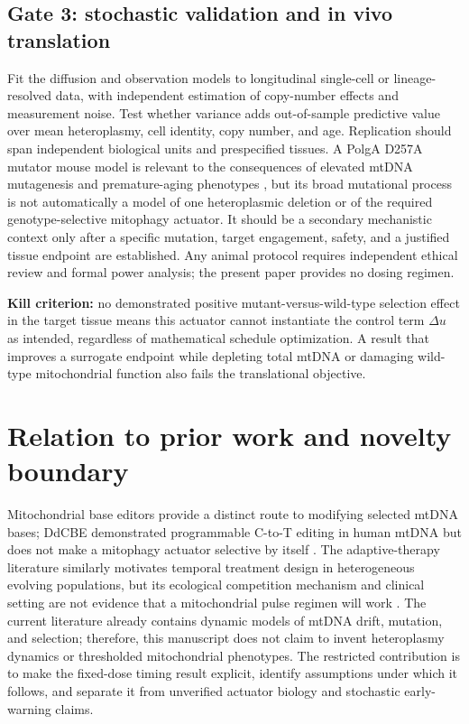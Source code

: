 \documentclass[11pt]{article}
\begin{document}
\subsection{Gate 3: stochastic validation and in vivo translation}
Fit the diffusion and observation models to longitudinal single-cell or lineage-resolved data, with independent estimation of copy-number effects and measurement noise. Test whether variance adds out-of-sample predictive value over mean heteroplasmy, cell identity, copy number, and age. Replication should span independent biological units and prespecified tissues. A PolgA D257A mutator mouse model is relevant to the consequences of elevated mtDNA mutagenesis and premature-aging phenotypes \cite{Trifunovic2004}, but its broad mutational process is not automatically a model of one heteroplasmic deletion or of the required genotype-selective mitophagy actuator. It should be a secondary mechanistic context only after a specific mutation, target engagement, safety, and a justified tissue endpoint are established. Any animal protocol requires independent ethical review and formal power analysis; the present paper provides no dosing regimen.

\textbf{Kill criterion:} no demonstrated positive mutant-versus-wild-type selection effect in the target tissue means this actuator cannot instantiate the control term $\Delta u$ as intended, regardless of mathematical schedule optimization. A result that improves a surrogate endpoint while depleting total mtDNA or damaging wild-type mitochondrial function also fails the translational objective.

\section{Relation to prior work and novelty boundary}
Mitochondrial base editors provide a distinct route to modifying selected mtDNA bases; DdCBE demonstrated programmable C-to-T editing in human mtDNA but does not make a mitophagy actuator selective by itself \cite{Mok2020}. The adaptive-therapy literature similarly motivates temporal treatment design in heterogeneous evolving populations, but its ecological competition mechanism and clinical setting are not evidence that a mitochondrial pulse regimen will work \cite{Gatenby2009}. The current literature already contains dynamic models of mtDNA drift, mutation, and selection; therefore, this manuscript does not claim to invent heteroplasmy dynamics or thresholded mitochondrial phenotypes. The restricted contribution is to make the fixed-dose timing result explicit, identify assumptions under which it follows, and separate it from unverified actuator biology and stochastic early-warning claims.
\end{document}
